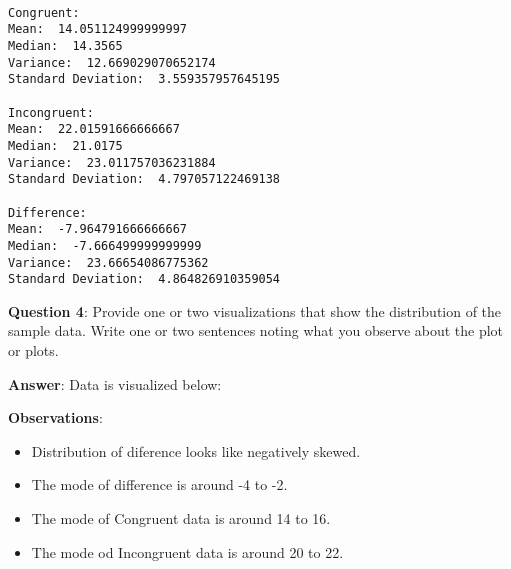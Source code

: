 \documentclass[11pt]{article}
\providecommand{\tightlist}{%
      \setlength{\itemsep}{0pt}\setlength{\parskip}{0pt}}
\begin{document}
    \begin{Verbatim}[commandchars=\\\{\}]

Congruent: 
Mean:  14.051124999999997
Median:  14.3565
Variance:  12.669029070652174
Standard Deviation:  3.559357957645195

Incongruent: 
Mean:  22.01591666666667
Median:  21.0175
Variance:  23.011757036231884
Standard Deviation:  4.797057122469138

Difference: 
Mean:  -7.964791666666667
Median:  -7.666499999999999
Variance:  23.66654086775362
Standard Deviation:  4.864826910359054

    \end{Verbatim}

    \textbf{Question 4}: Provide one or two visualizations that show the
distribution of the sample data. Write one or two sentences noting what
you observe about the plot or plots.

    \textbf{Answer}: Data is visualized below:

\textbf{Observations}:

\begin{itemize}
\tightlist
\item
  Distribution of diference looks like negatively skewed.
\item
  The mode of difference is around -4 to -2.
\item
  The mode of Congruent data is around 14 to 16.
\item
  The mode od Incongruent data is around 20 to 22.
\end{itemize}
\end{document}
